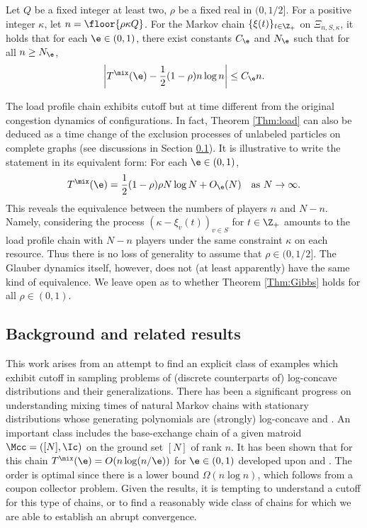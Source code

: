 \documentclass[12pt, reqno]{amsart}
\begin{document}
\begin{theorem}\label{Thm:load}
Let $Q$ be a fixed integer at least two,
$\rho$ be a fixed real in $(0, 1/2]$.
For a positive integer $\kappa$,
let $n=\floor{\rho \kappa Q}$.
For the Markov chain $\{\xi(t)\}_{t \in \Z_+}$ on $\Xi_{n, S, \kappa}$,
it holds that for each $\e \in (0, 1)$,
there exist constants $C_\e$ and $N_\e$ such that for all $n \ge N_\e$,
\[
\left|T^\mix(\e)-\frac{1}{2}(1-\rho)n\log n\right| \le C_\e n.
\]
\end{theorem}


The load profile chain exhibits cutoff but at time different from the original congestion dynamics of configurations.
In fact, Theorem \ref{Thm:load} can also be deduced as a time change of the exclusion processes of unlabeled particles on complete graphs \cite[Theorem 1.1]{LacoinLeblond} (see discussions in Section \ref{Sec:background}).
It is illustrative to write the statement in its equivalent form:
For each $\e \in (0, 1)$,
\[
T^\mix(\e)=\frac{1}{2}(1-\rho)\rho N\log N+O_\e(N) \quad \text{as $N \to \infty$}.
\]
This reveals the equivalence between the numbers of players $n$ and $N-n$.
Namely,
considering the process $(\kappa-\xi_v(t))_{v\in S}$ for $t \in \Z_+$ amounts to the load profile chain with $N-n$ players under the same constraint $\kappa$ on each resource.
Thus there is no loss of generality to assume that $\rho \in (0, 1/2]$.
The Glauber dynamics itself, however, does not (at least apparently) have the same kind of equivalence.
We leave open as to whether Theorem \ref{Thm:Gibbs} holds for all $\rho \in (0, 1)$.









\subsection{Background and related results}\label{Sec:background}


This work arises from an attempt to find an explicit class of examples which exhibit cutoff 
in sampling problems of (discrete counterparts of) log-concave distributions and their generalizations.
There has been a significant progress on understanding mixing times of natural Markov chains with stationary distributions whose generating polynomials are (strongly) log-concave \cite{logconcaveII} and \cite{LogconcaveIIannales}.
An important class includes the base-exchange chain of a given matroid $\Mcc=([N], \Ic)$ on the ground set $[N]$ of rank $n$.
It has been shown that for this chain $T^\mix(\e)=O(n\log (n/\e))$ for $\e \in (0, 1)$ \cite[a special case of Theorem 1]{logconcaveIV} developed upon \cite{CryanGuoMousa2021} and \cite{logconcaveII}.
The order is optimal since there is a lower bound $\Omega(n \log n)$, which follows from a coupon collector problem.
Given the results, it is tempting to understand a cutoff for this type of chains,
or to find a reasonably wide class of chains for which we are able to establish an abrupt convergence.
\end{document}
